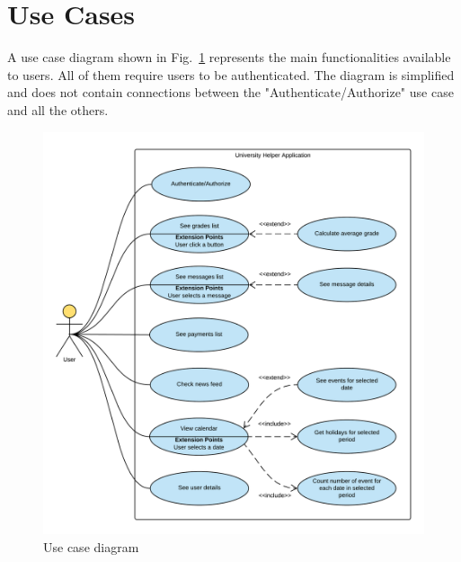 \section{Use Cases}
A use case diagram shown in Fig.~\ref{fig:use-case-diagram} represents the main functionalities available to users. All of them require users to be authenticated. The diagram is simplified and does not contain connections between the "Authenticate/Authorize" use case and all the others.

\begin{figure}[htb]
    \centering
    \includegraphics[width=\textwidth]{fig02/use_case_diagram.png}
    \caption{Use case diagram} \label{fig:use-case-diagram}
\end{figure}


